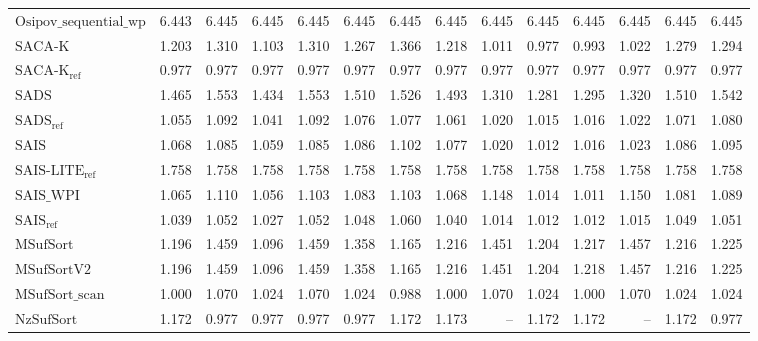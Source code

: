 \begin{table}[h]
{\begin{tabular}{lrrrrrrrrrrrrr}
    $\text{Osipov\_sequential\_wp}$ & {\color{red}6.443} & {\color{red}6.445} & {\color{red}6.445} & {\color{red}6.445} & {\color{red}6.445} & {\color{red}6.445} & {\color{red}6.445} & {\color{red}6.445} & {\color{red}6.445} & {\color{red}6.445} & {\color{red}6.445} & {\color{red}6.445} & {\color{red}6.445} \\
    $\text{SACA-K}$ & 1.203 & 1.310 & 1.103 & 1.310 & 1.267 & 1.366 & 1.218 & 1.011 & 0.977 & 0.993 & 1.022 & 1.279 & 1.294 \\
    $\text{SACA-K}_{\text{ref}}$ & {\color{green!60!black}0.977} & {\color{green!60!black}0.977} & {\color{green!60!black}0.977} & {\color{green!60!black}0.977} & {\color{green!60!black}0.977} & {\color{green!60!black}0.977} & {\color{green!60!black}0.977} & {\color{green!60!black}0.977} & {\color{green!60!black}0.977} & {\color{green!60!black}0.977} & {\color{green!60!black}0.977} & {\color{green!60!black}0.977} & {\color{green!60!black}0.977} \\
    $\text{SADS}$ & 1.465 & 1.553 & 1.434 & 1.553 & 1.510 & 1.526 & 1.493 & 1.310 & 1.281 & 1.295 & 1.320 & 1.510 & 1.542 \\
    $\text{SADS}_{\text{ref}}$ & 1.055 & 1.092 & 1.041 & 1.092 & 1.076 & 1.077 & 1.061 & 1.020 & 1.015 & 1.016 & 1.022 & 1.071 & 1.080 \\
    $\text{SAIS}$ & 1.068 & 1.085 & 1.059 & 1.085 & 1.086 & 1.102 & 1.077 & 1.020 & 1.012 & 1.016 & 1.023 & 1.086 & 1.095 \\
    $\text{SAIS-LITE}_{\text{ref}}$ & 1.758 & 1.758 & 1.758 & 1.758 & 1.758 & 1.758 & 1.758 & 1.758 & 1.758 & 1.758 & 1.758 & 1.758 & 1.758 \\
    $\text{SAIS\_WPI}$ & 1.065 & 1.110 & 1.056 & 1.103 & 1.083 & 1.103 & 1.068 & 1.148 & 1.014 & 1.011 & 1.150 & 1.081 & 1.089 \\
    $\text{SAIS}_{\text{ref}}$ & 1.039 & 1.052 & 1.027 & 1.052 & 1.048 & 1.060 & 1.040 & 1.014 & 1.012 & 1.012 & 1.015 & 1.049 & 1.051 \\
    $\text{MSufSort}$ & 1.196 & 1.459 & 1.096 & 1.459 & 1.358 & 1.165 & 1.216 & 1.451 & 1.204 & 1.217 & 1.457 & 1.216 & 1.225 \\
    $\text{MSufSortV2}$ & 1.196 & 1.459 & 1.096 & 1.459 & 1.358 & 1.165 & 1.216 & 1.451 & 1.204 & 1.218 & 1.457 & 1.216 & 1.225 \\
    $\text{MSufSort\_scan}$ & 1.000 & 1.070 & 1.024 & 1.070 & 1.024 & 0.988 & 1.000 & 1.070 & 1.024 & 1.000 & 1.070 & 1.024 & 1.024 \\
    $\text{NzSufSort}$ & 1.172 & {\color{green!60!black}0.977} & {\color{green!60!black}0.977} & {\color{green!60!black}0.977} & 0.977 & 1.172 & 1.173 & {\color{darkgray}--} & 1.172 & 1.172 & {\color{darkgray}--} & 1.172 & 0.977 \\

\end{tabular}}
\end{table}
